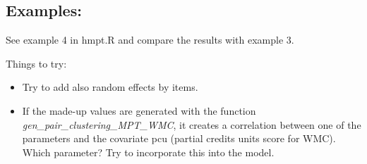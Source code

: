 \documentclass[10pt,a4paper]{article}
\begin{document}
\subsection{Examples:}

See example 4 in hmpt.R and compare the results with example 3.

Things to try:
\begin{itemize}
\item Try to add also random effects by items.
\item If the made-up values are generated with the function \emph{gen\_pair\_clustering\_MPT\_WMC}, it creates a correlation between one of the parameters and the covariate pcu (partial credits units score for WMC). Which parameter? Try to incorporate this into the model.
\end{itemize}





\printbibliography
\end{document}
